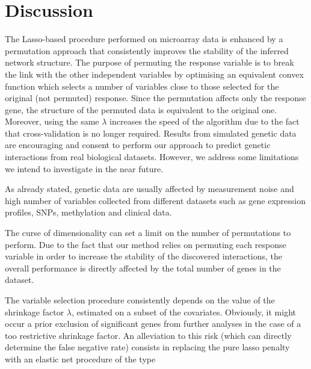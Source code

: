 \section{Discussion} \label{discussion}
The Lasso-based procedure performed on microarray data is enhanced by a permutation approach that consistently improves the stability of the inferred network structure. The purpose of permuting the response variable is to break the link with the other independent variables by optimising an equivalent convex function which selects a number of variables close to those selected for the original (not permuted) response. Since the permutation affects only the response gene, the structure of the permuted data is equivalent to the original one. Moreover, using the same $\lambda$ increases the speed of the algorithm due to the fact that cross-validation is no longer required. 
Results from simulated genetic data are encouraging and consent to perform our approach to predict genetic interactions from real biological datasets. However, we address some limitations we intend to investigate in the near future. 

As already stated, genetic data are usually affected by measurement noise and high number of variables collected from different datasets such as gene expression profiles, SNPs, methylation and clinical data. 

The curse of dimensionality can set a limit on the number of permutations to perform. Due to the fact that our method relies on permuting each response variable in order to increase the stability of the discovered interactions, the overall performance is directly affected by the total number of genes in the dataset. 


The variable selection procedure consistently depends on the value of the shrinkage factor $\lambda$, estimated on a subset of the covariates. Obviously, it might occur a prior exclusion of significant genes from further analyses in the case of a too restrictive shrinkage factor. An alleviation to this risk (which can  directly determine the false negative rate) consists in replacing the pure lasso penalty with an elastic net procedure of the type

